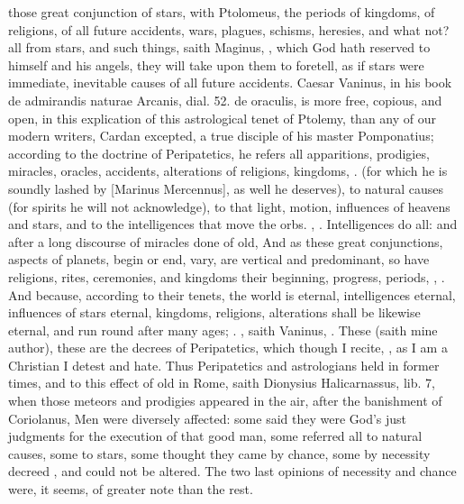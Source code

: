 {those great conjunction of stars, with Ptolomeus, the periods of
kingdoms, of religions, of all future accidents, wars, plagues,
schisms, heresies, and what not? all from stars, and such things, saith
Maginus, , which God
hath reserved to himself and his angels, they will take upon them to
foretell, as if stars were immediate, inevitable causes of all future
accidents. Caesar Vaninus, in his book \textlatin{de admirandis naturae Arcanis,
dial. 52. de oraculis}, is more free, copious, and open, in this
explication of this astrological tenet of Ptolemy, than any of our
modern writers, Cardan excepted, a true disciple of his master
Pomponatius; according to the doctrine of Peripatetics, he refers all
apparitions, prodigies, miracles, oracles, accidents, alterations of
religions, kingdoms, \etc{}. (for which he is soundly lashed by [Marinus
Mercennus], as well he deserves), to natural causes (for spirits he will
not acknowledge), to that light, motion, influences of heavens and
stars, and to the intelligences that move the orbs. , \etc{}. Intelligences do all: and after a long
discourse of miracles done of old,  And as these great conjunctions,
aspects of planets, begin or end, vary, are vertical and predominant,
so have religions, rites, ceremonies, and kingdoms their beginning,
progress, periods, , \etc{}. And because, according to their tenets, the world
is eternal, intelligences eternal, influences of stars eternal,
kingdoms, religions, alterations shall be likewise eternal, and run
round after many ages;  \etc{}. , saith Vaninus, . These (saith mine author), these are the
decrees of Peripatetics, which though I recite, , as I am a Christian I detest and hate. Thus
Peripatetics and astrologians held in former times, and to this effect
of old in Rome, saith Dionysius Halicarnassus, lib. 7, when those
meteors and prodigies appeared in the air, after the banishment of
Coriolanus,  Men were diversely affected: some said they were
God's just judgments for the execution of that good man, some referred
all to natural causes, some to stars, some thought they came by chance,
some by necessity decreed , and could not be altered. The two
last opinions of necessity and chance were, it seems, of greater note
than the rest.

}
